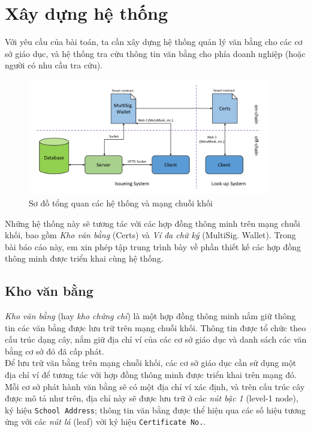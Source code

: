 \newpage
\section{Xây dựng hệ thống}

Với yêu cầu của bài toán, ta cần xây dựng hệ thống quản lý văn bằng cho các cơ sở giáo dục, và hệ thống tra cứu thông tin văn bằng cho phía doanh nghiệp (hoặc người có nhu cầu tra cứu).\\

\begin{figure}[ht]
    \centering
    \includegraphics[width=400px]{images/system-overview.png}
    \caption{Sơ đồ tổng quan các hệ thống và mạng chuỗi khối}
    \label{images/system-overview}
\end{figure}

Những hệ thống này sẽ tương tác với các hợp đồng thông minh trên mạng chuỗi khối, bao gồm \textit{Kho văn bằng} (Certs) và \textit{Ví đa chữ ký} (MultiSig. Wallet). Trong bài báo cáo này, em xin phép tập trung trình bày về phần thiết kế các hợp đồng thông minh được triển khai cùng hệ thống.


\subsection{Kho văn bằng}
\textit{Kho văn bằng} (hay \textit{kho chứng chỉ}) là một hợp đồng thông minh nắm giữ thông tin các văn bằng được lưu trữ trên mạng chuỗi khối. Thông tin được tổ chức theo cấu trúc dạng cây, nắm giữ địa chỉ ví của các cơ sở giáo dục và danh sách các văn bằng cơ sở đó đã cấp phát.\\

Để lưu trữ văn bằng trên mạng chuỗi khối, các cơ sở giáo dục cần sử dụng một địa chỉ ví để tương tác với hợp đồng thông minh được triển khai trên mạng đó. Mỗi cơ sở phát hành văn bằng sẽ có một địa chỉ ví xác định, và trên cấu trúc cây được mô tả như trên, địa chỉ này sẽ được lưu trữ ở các \textit{nút bậc 1} (level-1 node), ký hiệu \texttt{School Address}; thông tin văn bằng được thể hiện qua các số hiệu tương ứng với các \textit{nút lá} (leaf) với ký hiệu \texttt{Certificate No.}.\\

